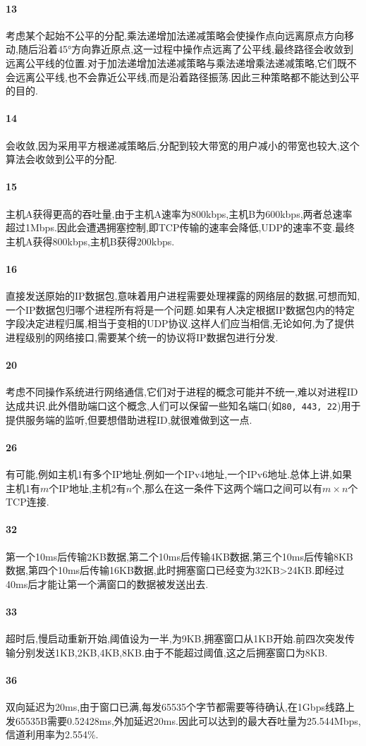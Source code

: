 \documentclass[a4paper]{article}
\begin{document}
\paragraph{13}
考虑某个起始不公平的分配,乘法递增加法递减策略会使操作点向远离原点方向移动,随后沿着\ang{45}方向靠近原点,这一过程中操作点远离了公平线,最终路径会收敛到远离公平线的位置.对于加法递增加法递减策略与乘法递增乘法递减策略,它们既不会远离公平线,也不会靠近公平线,而是沿着路径振荡.因此三种策略都不能达到公平的目的.
\paragraph{14}
会收敛,因为采用平方根递减策略后,分配到较大带宽的用户减小的带宽也较大,这个算法会收敛到公平的分配.
\paragraph{15}
主机A获得更高的吞吐量,由于主机A速率为800kbps,主机B为600kbps,两者总速率超过1Mbps.因此会遭遇拥塞控制,即TCP传输的速率会降低,UDP的速率不变.最终主机A获得800kbps,主机B获得200kbps.
\paragraph{16}
直接发送原始的IP数据包,意味着用户进程需要处理裸露的网络层的数据,可想而知,一个IP数据包归哪个进程所有将是一个问题.如果有人决定根据IP数据包内的特定字段决定进程归属,相当于变相的UDP协议.这样人们应当相信,无论如何,为了提供进程级别的网络接口,需要某个统一的协议将IP数据包进行分发.
\paragraph{20}
考虑不同操作系统进行网络通信,它们对于进程的概念可能并不统一,难以对进程ID达成共识.此外借助端口这个概念,人们可以保留一些知名端口(如\verb|80, 443, 22|)用于提供服务端的监听,但要想借助进程ID,就很难做到这一点.
\paragraph{26}
有可能,例如主机1有多个IP地址,例如一个IPv4地址,一个IPv6地址.总体上讲,如果主机1有$m$个IP地址,主机2有$n$个,那么在这一条件下这两个端口之间可以有$m\times n$个TCP连接.
\paragraph{32}
第一个10ms后传输2KB数据,第二个10ms后传输4KB数据,第三个10ms后传输8KB数据,第四个10ms后传输16KB数据,此时拥塞窗口已经变为32KB>24KB.即经过40ms后才能让第一个满窗口的数据被发送出去.
\paragraph{33}
超时后,慢启动重新开始,阈值设为一半,为9KB,拥塞窗口从1KB开始.前四次突发传输分别发送1KB,2KB,4KB,8KB.由于不能超过阈值,这之后拥塞窗口为8KB.
\paragraph{36}
双向延迟为20ms,由于窗口已满,每发65535个字节都需要等待确认,在1Gbps线路上发65535B需要0.52428ms,外加延迟20ms.因此可以达到的最大吞吐量为25.544Mbps,信道利用率为2.554\%.
\end{document}
